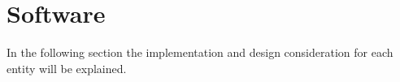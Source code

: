\section{Software}
In the following section the implementation and design consideration for each entity will be explained. 





